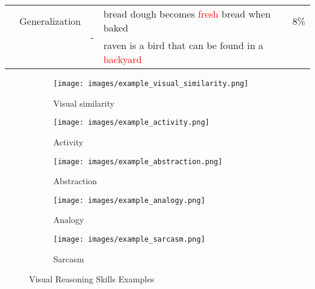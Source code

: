\documentclass{article}
\begin{document}
\begin{table}[!htb]
{\begin{tabular}{@{}lllll@{}}
                                    \\ \cmidrule(l){2-5}&{Generalization}    & \multirow{2}{*}{ -}                                                                                                                                          & \textcolor{mygreen}{bread dough} becomes \textcolor{red}{fresh} bread when baked     & {8\%}                                                                                                  \\
                                     &&                                                                                                                & \textcolor{mygreen}{raven} is a bird that can be found in a \textcolor{red}{backyard} &                                                                                                       \\ \bottomrule  
\end{tabular}
}
\end{table} \begin{figure}[!htb]
\centering
\begin{subfigure}[b]{0.425\textwidth}
   \texttt{[image: images/example\_visual\_similarity.png]}
   \caption{Visual similarity}
\end{subfigure}

\begin{subfigure}[b]{0.425\textwidth}
   \texttt{[image: images/example\_activity.png]}
   \caption{Activity}
\end{subfigure}

\begin{subfigure}[b]{0.425\textwidth}
   \texttt{[image: images/example\_abstraction.png]}
   \caption{Abstraction}
\end{subfigure}

\begin{subfigure}[b]{0.425\textwidth}
   \texttt{[image: images/example\_analogy.png]}
   \caption{Analogy}
\end{subfigure}

\begin{subfigure}[b]{0.425\textwidth}
   \texttt{[image: images/example\_sarcasm.png]}
   \caption{Sarcasm}
\end{subfigure}

\caption{Visual Reasoning Skills Examples}
\label{fig:examples_visual_reasoning}
\end{figure}
\end{document}

